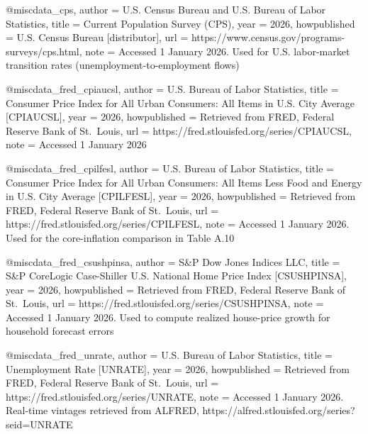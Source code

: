 @misc{data_cps,
  author       = {{U.S. Census Bureau and U.S. Bureau of Labor Statistics}},
  title        = {Current Population Survey ({CPS})},
  year         = {2026},
  howpublished = {U.S. Census Bureau [distributor]},
  url          = {https://www.census.gov/programs-surveys/cps.html},
  note         = {Accessed 1 January 2026. Used for U.S. labor-market transition rates (unemployment-to-employment flows)}
}


@misc{data_fred_cpiaucsl,
  author       = {{U.S. Bureau of Labor Statistics}},
  title        = {Consumer Price Index for All Urban Consumers: All Items in {U.S.} City Average [{CPIAUCSL}]},
  year         = {2026},
  howpublished = {Retrieved from {FRED}, Federal Reserve Bank of St.\ Louis},
  url          = {https://fred.stlouisfed.org/series/CPIAUCSL},
  note         = {Accessed 1 January 2026}
}

@misc{data_fred_cpilfesl,
  author       = {{U.S. Bureau of Labor Statistics}},
  title        = {Consumer Price Index for All Urban Consumers: All Items Less Food and Energy in {U.S.} City Average [{CPILFESL}]},
  year         = {2026},
  howpublished = {Retrieved from {FRED}, Federal Reserve Bank of St.\ Louis},
  url          = {https://fred.stlouisfed.org/series/CPILFESL},
  note         = {Accessed 1 January 2026. Used for the core-inflation comparison in Table A.10}
}

@misc{data_fred_csushpinsa,
  author       = {{S\&P Dow Jones Indices LLC}},
  title        = {S\&{P} {C}oreLogic {C}ase-{S}hiller {U.S.} National Home Price Index [{CSUSHPINSA}]},
  year         = {2026},
  howpublished = {Retrieved from {FRED}, Federal Reserve Bank of St.\ Louis},
  url          = {https://fred.stlouisfed.org/series/CSUSHPINSA},
  note         = {Accessed 1 January 2026. Used to compute realized house-price growth for household forecast errors}
}


@misc{data_fred_unrate,
  author       = {{U.S. Bureau of Labor Statistics}},
  title        = {Unemployment Rate [{UNRATE}]},
  year         = {2026},
  howpublished = {Retrieved from {FRED}, Federal Reserve Bank of St.\ Louis},
  url          = {https://fred.stlouisfed.org/series/UNRATE},
  note         = {Accessed 1 January 2026. Real-time vintages retrieved from {ALFRED}, https://alfred.stlouisfed.org/series?seid=UNRATE}
}

